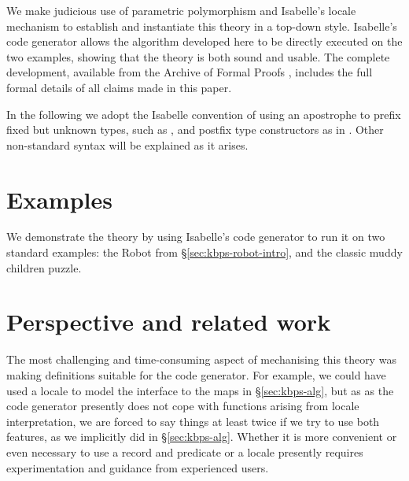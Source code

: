 \documentclass{article}
\newcommand{\isafun}[1]{{\sf #1}}
\renewcommand{\isacharprime}{\ensuremath{\mathit{\mskip2mu'\mskip-2mu}}}
\begin{document}
We make judicious use of parametric polymorphism and Isabelle's locale
mechanism \cite{DBLP:conf/mkm/Ballarin06} to establish and instantiate
this theory in a top-down style. Isabelle's code generator
\cite{Haftmann-Nipkow:2010:code} allows the algorithm developed here
to be directly executed on the two examples, showing that the theory
is both sound and usable. The complete development, available from the
Archive of Formal Proofs \cite{Gammie:2011}, includes the full formal
details of all claims made in this paper.

In the following we adopt the Isabelle convention of using an
apostrophe to prefix fixed but unknown types, such as
\isa{{\isaliteral{27}{\isacharprime}}a}, and postfix type constructors
as in \isa{{\isaliteral{27}{\isacharprime}}a\ \isafun{list}}. Other
non-standard syntax will be explained as it arises.



















\section{Examples}
\label{sec:kbps-theory-examples}

We demonstrate the theory by using Isabelle's code generator to run it
on two standard examples: the Robot from \S\ref{sec:kbps-robot-intro},
and the classic muddy children puzzle.




\section{Perspective and related work}
\label{sec:perspective}
\label{sec:kbps-alg-reduction}

The most challenging and time-consuming aspect of mechanising this
theory was making definitions suitable for the code generator. For
example, we could have used a locale to model the interface to the
maps in \S\ref{sec:kbps-alg}, but as as the code generator presently
does not cope with functions arising from locale interpretation, we
are forced to say things at least twice if we try to use both
features, as we implicitly did in \S\ref{sec:kbps-alg}. Whether it is
more convenient or even necessary to use a record and predicate or a
locale presently requires experimentation and guidance from
experienced users.
\end{document}

